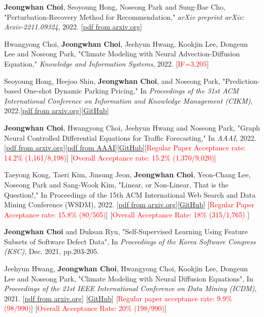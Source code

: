 \documentclass[10pt]{article}
\newenvironment{changemargin}[2]{
  \begin{list}{}{
    \setlength{\topsep}{0pt}
    \setlength{\leftmargin}{#1}
    \setlength{\rightmargin}{#2}
    \setlength{\listparindent}{\parindent}
    \setlength{\itemindent}{\parindent}
    \setlength{\parsep}{\parskip}
  }
  \item[]}{\end{list}
}
\newcommand{\presentation}[2]{
	{#1} \hfill \emph{#2}\\ \bigskip
}
\newcommand{\RED}[1]{\textcolor{red}{#1}}
\newenvironment{body} {
	\vspace*{-16pt}
	\begin{changemargin}{-0.25in}{-0.5in}
  }
	{\end{changemargin}
}
\begin{document}
\begin{body}
	\vspace{14pt}

\presentation{
\textbf{Jeongwhan Choi}, Seoyoung Hong, Noseong Park and Sung-Bae Cho, "Perturbation-Recovery Method for Recommendation," \emph{arXiv preprint arXiv: Arxiv-2211.09324}, 2022. [\href{https://arxiv.org/abs/2211.09324}{pdf from arxiv.org}]}{}
\presentation{
Hwangyong Choi, \textbf{Jeongwhan Choi}, Jeehyun Hwang, Kookjin Lee, Dongeun Lee and Noseong Park, "Climate Modeling with Neural Advection-Diffusion Equation," \emph{Knowledge and Information Systems}, 2022. [\RED{IF=3.205}]}{}
\presentation{Seoyoung Hong, Heejoo Shin, \textbf{Jeongwhan Choi}, and Noseong Park, "Prediction-based One-shot Dynamic Parking Pricing," In \emph{Proceedings of the 31st ACM International Conference on Information and Knowledge Management (CIKM)}, 2022.[\href{https://arxiv.org/abs/2208.14231}{pdf from arxiv.org}][\href{https://github.com/jeongwhanchoi/one-shot-optimization}{GitHub}]}{}
\presentation{\textbf{Jeongwhan Choi}, Hwangyong Choi, Jeehyun Hwang and Noseong Park, "Graph Neural Controlled Differential Equations for Traffic Forecasting," In \emph{AAAI}, 2022. [\href{https://arxiv.org/abs/2112.03558}{pdf from arxiv.org}][\href{https://ojs.aaai.org/index.php/AAAI/article/download/20587/20346}{pdf from AAAI}][\href{https://github.com/jeongwhanchoi/STG-NCDE}{GitHub}][\RED{Regular Paper Acceptance rate: 14.2\% (1,161/8,198)}] [\RED{Overall Acceptance rate: 15.2\% (1,370/9,020)] }} {}
\presentation{Taeyong Kong, Taeri Kim, Jinsung Jeon, \textbf{Jeongwhan Choi}, Yeon-Chang Lee, Noseong Park and Sang-Wook Kim, "Linear, or Non-Linear, That is the Question!," In Proceedings of the 15th ACM International Web Search and Data Mining Conference (WSDM), 2022.  [\href{https://arxiv.org/abs/2111.07265}{pdf from arxiv.org}][\href{https://github.com/jeongwhanchoi/HMLET}{GitHub}] [\RED{Regular Paper Acceptance rate: 15.8\% (80/505)}] [\RED{Overall Acceptance Rate: 18\%  (315/1,765)} ]}{}
\presentation{\textbf{Jeongwhan Choi} and Duksan Ryu, "Self-Supervised Learning Using Feature Subsets of Software Defect Data",  In \emph{Proceedings of the Korea Software Congress (KSC)}, Dec. 2021, pp.203-205.}{}
\presentation{Jeehyun Hwang, \textbf{Jeongwhan Choi}, Hwangyong Choi, Kookjin Lee, Dongeun Lee and Noseong Park, "Climate Modeling with Neural Diffusion Equations", In \emph{Proceedings of the 21st IEEE International Conference on Data Mining (ICDM)}, 2021.  [\href{https://arxiv.org/abs/2111.06011}{pdf from arxiv.org}] [\href{https://github.com/jeongwhanchoi/Neural-Diffusion-Equation}{GitHub}] [\RED{Regular paper acceptance rate: 9.9\%  (98/990)}] [\RED{Overall Acceptance Rate: 20\%  (198/990)}]}{}

\end{body}
\end{document}
